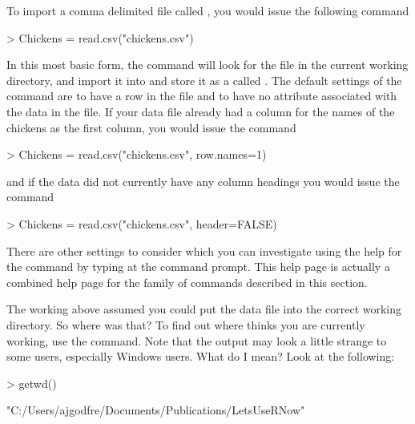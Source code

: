 To import a comma delimited file called , you would issue the following command 
\begin{Schunk}
\begin{Sinput}
> Chickens = read.csv("chickens.csv") 
\end{Sinput}
\end{Schunk}
In this most basic form, the  
 command will look for the  file in the current working directory, and import it into \R{} and store it as a  called . The default settings of the  command are to have a  row in the file and to have no  attribute associated with the data in the file. If your data file already had a column for the names of the chickens as the first column, you would issue the command 
\begin{Schunk}
\begin{Sinput}
> Chickens = read.csv("chickens.csv", row.names=1) 
\end{Sinput}
\end{Schunk}
and if the data did not currently have any column headings you would issue the command 
\begin{Schunk}
\begin{Sinput}
> Chickens = read.csv("chickens.csv", header=FALSE) 
\end{Sinput}
\end{Schunk}
 
There are other settings to consider which you can investigate using the help for the  command by typing  at the command prompt. This help page is actually a combined help page for the family of commands described in this section. 
 
The working above assumed you could put the data file into the correct working directory.  So where was that? To find out where \R{} thinks you are currently working, use the  command. Note that the output may look a little strange to some users, especially Windows users. What do I mean? Look at the following: 
\begin{Schunk}
\begin{Sinput}
> getwd() 
\end{Sinput}
\begin{Soutput}
[1] "C:/Users/ajgodfre/Documents/Publications/LetsUseRNow"
\end{Soutput}
\end{Schunk}
 
